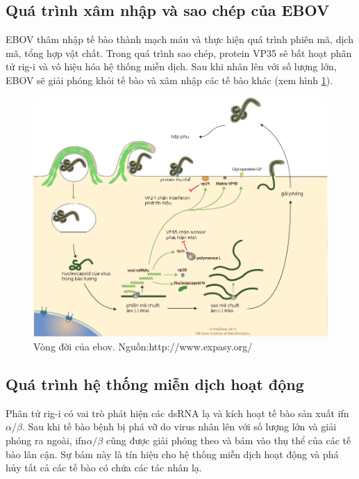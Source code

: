 \documentclass[12pt,a4paper,reqno, oneside]{book}
\begin{document}
\subsection{Quá trình xâm nhập và sao chép của EBOV}
\hspace{18pt}
		EBOV thâm nhập tế bào thành mạch máu và thực hiện quá trình phiên mã, dịch mã, tổng hợp vật chất\cite{}. Trong quá trình sao chép, protein VP35 sẽ bất hoạt phân tử \gls{rig-i} và vô hiệu hóa hệ thống miễn dịch. Sau khi nhân lên với số lượng lớn, EBOV sẽ giải phóng khỏi tế bào và xâm nhập các tế bào khác\cite{} (xem hình \ref{fig:viruscycle}).
		\begin{figure}[t]
		\centering
		\includegraphics[width=1.0\textwidth,natwidth=610,natheight=642]{Ebolavirus_cycle.png}
		\caption{Vòng đời của \gls{ebov}. Nguồn:http://www.expasy.org/}
		\label{fig:viruscycle}
		\end{figure}
\subsection{Quá trình hệ thống miễn dịch hoạt động}
\hspace{18pt}
		Phân tử \gls{rig-i} có vai trò phát hiện các dsRNA lạ và kích hoạt tế bào sản xuất \gls{ifn}$\alpha / \beta$\cite{Cardenas2006}. Sau khi tế bào bệnh bị phá vỡ do virus nhân lên với số lượng lớn và giải phóng ra ngoài, \gls{ifn}$\alpha / \beta$ cũng được giải phóng theo và bám vào thụ thể của các tế bào lân cận. Sự bám này là tín hiệu cho hệ thống miễn dịch hoạt động và phá hủy tất cả các tế bào có chứa các tác nhân lạ.\cite{DeAndrea2002}
		\begin{figure}[h]
		\centering
		
		\caption{}
		\label{}
		\end{figure}
\end{document}
